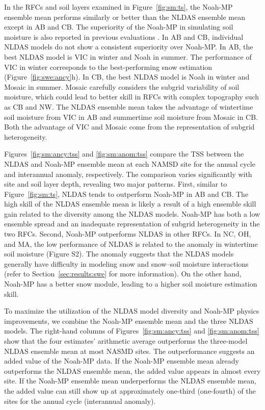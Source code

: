 \documentclass[essd, manuscript]{copernicus}
\begin{document}
In the RFCs and soil layers examined in Figure~\ref{fig:sm:ts}, the Noah-MP ensemble mean performs similarly or better than the NLDAS ensemble mean except in AB and CB\@. The superiority of the Noah-MP in simulating soil moisture is also reported in previous evaluations \citep{cai2014JGRAa}. In AB and CB, individual NLDAS models do not show a consistent superiority over Noah-MP\@. In AB, the best NLDAS model is VIC in winter and Noah in summer. The performance of VIC in winter corresponds to the best-performing snow estimation (Figure~\ref{fig:swe:ancy}h). In CB, the best NLDAS model is Noah in winter and Mosaic in summer. Mosaic carefully considers the subgrid variability of soil moisture, which could lead to better skill in RFCs with complex topography such as CB and NW\@. The NLDAS ensemble mean takes the advantage of wintertime soil moisture from VIC in AB and summertime soil moisture from Mosaic in CB\@. Both the advantage of VIC and Mosaic come from the representation of subgrid heterogeneity.

Figures~\ref{fig:sm:ancy:tss} and \ref{fig:sm:anom:tss} compare the TSS between the NLDAS and Noah-MP ensemble mean at each NAMSD site for the annual cycle and interannual anomaly, respectively. The comparison varies significantly with site and soil layer depth, revealing two major patterns. First, similar to Figure~\ref{fig:sm:ts}, NLDAS tends to outperform Noah-MP in AB and CB\@. The high skill of the NLDAS ensemble mean is likely a result of a high ensemble skill gain \citep{fei2021WRR} related to the diversity among the NLDAS models. Noah-MP has both a low ensemble spread and an inadequate representation of subgrid heterogeneity in the two RFCs. Second, Noah-MP outperforms NLDAS in other RFCs. In NC, OH, and MA, the low performance of NLDAS is related to the anomaly in wintertime soil moisture (Figure S2). The anomaly suggests that the NLDAS models generally have difficulty in modeling snow and snow--soil moisture interactions (refer to Section~\ref{sec:results:swe} for more information). On the other hand, Noah-MP has a better snow module, leading to a higher soil moisture estimation skill.

To maximize the utilization of the NLDAS model diversity and Noah-MP physics improvements, we combine the Noah-MP ensemble mean and the three NLDAS models. The right-hand columns of Figures~\ref{fig:sm:ancy:tss} and \ref{fig:sm:anom:tss} show that the four estimates' arithmetic average outperforms the three-model NLDAS ensemble mean at most NASMD sites. The outperformance suggests an added value of the Noah-MP data. If the Noah-MP ensemble mean already outperforms the NLDAS ensemble mean, the added value appears in almost every site. If the Noah-MP ensemble mean underperforms the NLDAS ensemble mean, the added value can still show up at approximately one-third (one-fourth) of the sites for the annual cycle (interannual anomaly).
\end{document}
